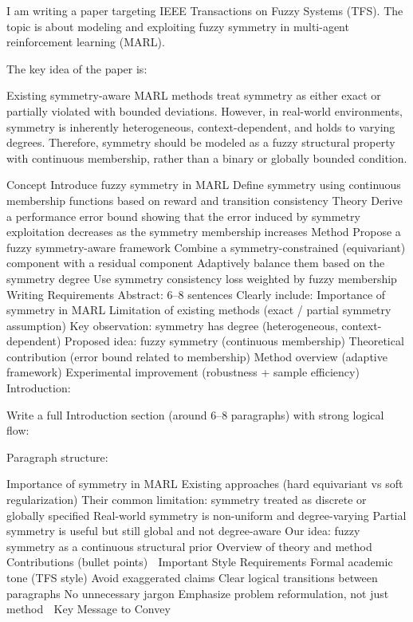 I am writing a paper targeting IEEE Transactions on Fuzzy Systems (TFS).
The topic is about modeling and exploiting fuzzy symmetry in multi-agent reinforcement learning (MARL).


The key idea of the paper is:

Existing symmetry-aware MARL methods treat symmetry as either exact or partially violated with bounded deviations.
However, in real-world environments, symmetry is inherently heterogeneous, context-dependent, and holds to varying degrees.
Therefore, symmetry should be modeled as a fuzzy structural property with continuous membership, rather than a binary or globally bounded condition.

Concept
Introduce fuzzy symmetry in MARL
Define symmetry using continuous membership functions based on reward and transition consistency
Theory
Derive a performance error bound showing that the error induced by symmetry exploitation decreases as the symmetry membership increases
Method
Propose a fuzzy symmetry-aware framework
Combine a symmetry-constrained (equivariant) component with a residual component
Adaptively balance them based on the symmetry degree
Use symmetry consistency loss weighted by fuzzy membership
🔹 Writing Requirements
Abstract:
6–8 sentences
Clearly include:
Importance of symmetry in MARL
Limitation of existing methods (exact / partial symmetry assumption)
Key observation: symmetry has degree (heterogeneous, context-dependent)
Proposed idea: fuzzy symmetry (continuous membership)
Theoretical contribution (error bound related to membership)
Method overview (adaptive framework)
Experimental improvement (robustness + sample efficiency)
Introduction:

Write a full Introduction section (around 6–8 paragraphs) with strong logical flow:

Paragraph structure:

Importance of symmetry in MARL
Existing approaches (hard equivariant vs soft regularization)
Their common limitation: symmetry treated as discrete or globally specified
Real-world symmetry is non-uniform and degree-varying
Partial symmetry is useful but still global and not degree-aware
Our idea: fuzzy symmetry as a continuous structural prior
Overview of theory and method
Contributions (bullet points)
🔹 Important Style Requirements
Formal academic tone (TFS style)
Avoid exaggerated claims
Clear logical transitions between paragraphs
No unnecessary jargon
Emphasize problem reformulation, not just method
🔹 Key Message to Convey

